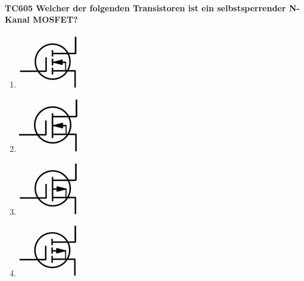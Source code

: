 \documentclass[8pt]{article}
\begin{document}
\begin{enumerate}
\begin{enumerate}[nolistsep,label=\Alph*]
{\begin{enumerate}[nolistsep,label=\Alph*]
\paragraph*{TC605 Welcher der folgenden Transistoren ist ein selbstsperrender N-Kanal MOSFET?}
\begin{enumerate}[nolistsep,label=\Alph*]
\item
	\begin{center}
		\begin{minipage}{\linewidth}
			\centering
			\includegraphics[scale=1.0]{pics/tc605_a.jpg}
		\end{minipage}
	\end{center}
\item
	\begin{center}
		\begin{minipage}{\linewidth}
			\centering
			\includegraphics[scale=1.0]{pics/tc605_b.jpg}
		\end{minipage}
	\end{center}
\item
	\begin{center}
		\begin{minipage}{\linewidth}
			\centering
			\includegraphics[scale=1.0]{pics/tc605_c.jpg}
		\end{minipage}
	\end{center}
\item
	\begin{center}
		\begin{minipage}{\linewidth}
			\centering
			\includegraphics[scale=1.0]{pics/tc605_d.jpg}
		\end{minipage}
	\end{center}
\end{enumerate}


\end{enumerate}}
\end{enumerate}
\end{enumerate}
\end{document}
